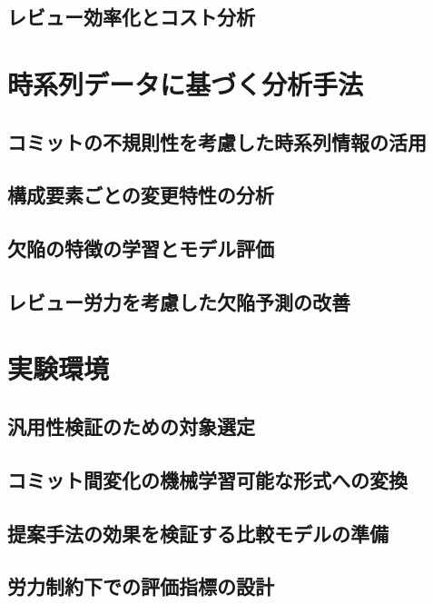 \documentclass[12pt,a4j]{ltjsreport}
\begin{document}
\section{レビュー効率化とコスト分析}

\clearpage

\chapter{時系列データに基づく分析手法}
\section{コミットの不規則性を考慮した時系列情報の活用}

\section{構成要素ごとの変更特性の分析}

\section{欠陥の特徴の学習とモデル評価}

\section{レビュー労力を考慮した欠陥予測の改善}

\clearpage

\chapter{実験環境}
\section{汎用性検証のための対象選定}

\section{コミット間変化の機械学習可能な形式への変換}

\section{提案手法の効果を検証する比較モデルの準備}

\section{労力制約下での評価指標の設計}

\clearpage
\end{document}
